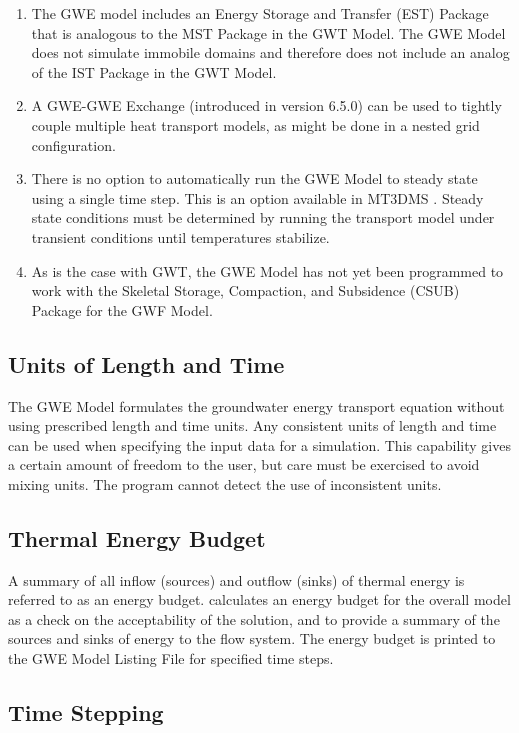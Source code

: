 \begin{enumerate}
\item The GWE model includes an Energy Storage and Transfer (EST) Package that is analogous to the MST Package in the GWT Model.  The GWE Model does not simulate immobile domains and therefore does not include an analog of the IST Package in the GWT Model.  

\item A GWE-GWE Exchange (introduced in version 6.5.0) can be used to tightly couple multiple heat transport models, as might be done in a nested grid configuration.  

\item There is no option to automatically run the GWE Model to steady state using a single time step.  This is an option available in MT3DMS \citep{zheng2010supplemental}.  Steady state conditions must be determined by running the transport model under transient conditions until temperatures stabilize.

\item As is the case with GWT, the GWE Model has not yet been programmed to work with the Skeletal Storage, Compaction, and Subsidence (CSUB) Package for the GWF Model.  

\end{enumerate}

\subsection{Units of Length and Time}
The GWE Model formulates the groundwater energy transport equation without using prescribed length and time units. Any consistent units of length and time can be used when specifying the input data for a simulation. This capability gives a certain amount of freedom to the user, but care must be exercised to avoid mixing units.  The program cannot detect the use of inconsistent units.

\subsection{Thermal Energy Budget}
A summary of all inflow (sources) and outflow (sinks) of thermal energy is referred to as an energy budget.  \mf calculates an energy budget for the overall model as a check on the acceptability of the solution, and to provide a summary of the sources and sinks of energy to the flow system.  The energy budget is printed to the GWE Model Listing File for specified time steps.

\subsection{Time Stepping}

